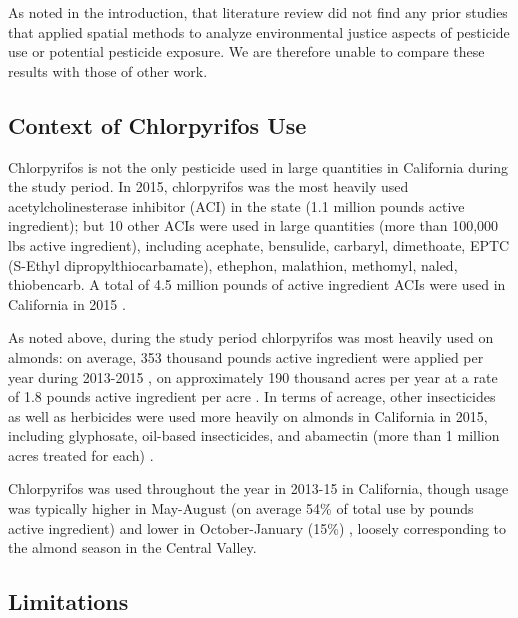\documentclass[ijerph,article,submit,oneauthor,pdftex]{Definitions/mdpi}
\begin{document}
As noted in the introduction, that literature review did not find any prior studies that applied spatial methods to analyze environmental justice aspects of pesticide use or potential pesticide exposure.  We are therefore unable to compare these results with those of other work.  

\hypertarget{context}{%
\subsection{Context of Chlorpyrifos Use}\label{context}}

Chlorpyrifos is not the only pesticide used in large quantities in California during the study period.  In 2015, chlorpyrifos was the most heavily used acetylcholinesterase inhibitor (ACI) in the state (1.1 million pounds active ingredient); but 10 other ACIs were used in large quantities (more than 100,000 lbs active ingredient), including acephate, bensulide, carbaryl, dimethoate, EPTC (S-Ethyl dipropylthiocarbamate), ethephon, malathion, methomyl, naled, thiobencarb.  A total of 4.5 million pounds of active ingredient ACIs were used in California in 2015 \citet[table 7]{CaliforniaDepartmentofPesticideRegulationSummaryPesticideUse2017}.  

As noted above, during the study period chlorpyrifos was most heavily used on almonds:  on average, 353 thousand pounds active ingredient were applied per year during 2013-2015 \citep[table 4]{SegawaEvaluationOptionsInterim2017}, on approximately 190 thousand acres per year at a rate of 1.8 pounds active ingredient per acre \citep[table 5]{SegawaEvaluationOptionsInterim2017}.  In terms of acreage, other insecticides as well as herbicides were used more heavily on almonds in California in 2015, including glyphosate, oil-based insecticides, and abamectin (more than 1 million acres treated for each) \citet[figure 16]{CaliforniaDepartmentofPesticideRegulationSummaryPesticideUse2017}.  

Chlorpyrifos was used throughout the year in 2013-15 in California, though usage was typically higher in May-August (on average 54\% of total use by pounds active ingredient) and lower in October-January (15\%) \citep[table 7]{SegawaEvaluationOptionsInterim2017}, loosely corresponding to the almond season in the Central Valley.  

\hypertarget{limitations}{%
\subsection{Limitations}\label{limitations}}
\end{document}
